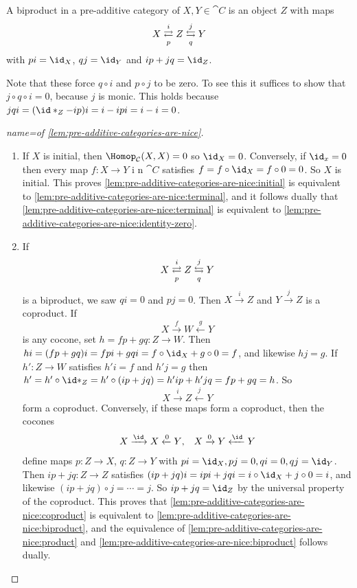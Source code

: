 \documentclass[../main.tex]{subfiles}
\begin{document}
\begin{defn}
  A biproduct in a pre-additive category of $X, Y \in \cat C$ is an object $Z$ with maps \[X \xrightleftarrows{i}[p] Z \xleftrightarrows{j}[q] Y\] with $pi = \id_X$, $qj = \id_Y$ and $ip + jq = \id_Z$.
\end{defn}
\begin{rmk}
  Note that these force $q \circ i$ and $p \circ j$ to be zero. To see this it suffices to show that $j \circ q \circ i = 0$, because $j$ is monic.
  This holds because $jqi = (\id*_Z - ip)i = i - ipi = i - i = 0$.
\end{rmk}

\begin{proof}[name={of \cref{lem:pre-additive-categories-are-nice}}]
  \begin{enumerate}
      \item If $X$ is initial, then $\Hom_{\cat C}(X, X) = 0$ so $\id_X = 0$.
    Conversely, if $\id_x = 0$ then every map $f\colon X \to Y$ i n $\cat C$ satisfies $f = f \circ \id_X = f \circ 0 = 0$. So $X$ is initial. This proves \cref{lem:pre-additive-categories-are-nice:initial} is equivalent to \cref{lem:pre-additive-categories-are-nice:terminal}, and it follows dually that \cref{lem:pre-additive-categories-are-nice:terminal} is equivalent to \cref{lem:pre-additive-categories-are-nice:identity-zero}.
    \item If \[X \xrightleftarrows{i}[p] Z \xleftrightarrows{j}[q] Y\] is a biproduct, we saw $qi = 0$ and $pj = 0$. Then $X \xrightarrow{i} Z$ and $Y \xrightarrow{j} Z$ is a coproduct. If \[X \xrightarrow{f} W \xleftarrow{g} Y\] is any cocone, set $h = fp + gq\colon Z \to W$. Then $hi = (fp + gq)i = fpi + gqi = f \circ \id_X + g \circ 0 = f$, and likewise $hj = g$. If $h'\colon Z \to W$ satisfies $h'i = f$ and $h'j = g$ then $h' = h' \circ \id*_Z = h' \circ (ip + jq) = h'ip + h'jq = fp + gq = h$. So \[X \xrightarrow{i} Z \xleftarrow{j} Y\] form a coproduct. Conversely, if these maps form a coproduct, then the cocones 
    \begin{align*}
          X \xrightarrow{\id} X \xleftarrow{0} Y\text{,} && X \xrightarrow{0} Y \xleftarrow{\id} Y      
    \end{align*}
    define maps $p\colon Z \to X$, $q\colon Z \to Y$ with $pi = \id_X, pj = 0, qi = 0, qj = \id_Y$. Then $ip + jq\colon Z \to Z$ satisfies $(ip + jq)i = ipi + jqi = i \circ \id_X + j \circ 0 = i$, and likewise $(ip + jq)\circ j = \cdots = j$. So $ip + jq = \id_Z$ by the universal property of the coproduct. This proves that \cref{lem:pre-additive-categories-are-nice:coproduct} is equivalent to \cref{lem:pre-additive-categories-are-nice:biproduct}, and the equivalence of \cref{lem:pre-additive-categories-are-nice:product} and \cref{lem:pre-additive-categories-are-nice:biproduct} follows dually. \qedhere
    \end{enumerate}
\end{proof}
\end{document}
